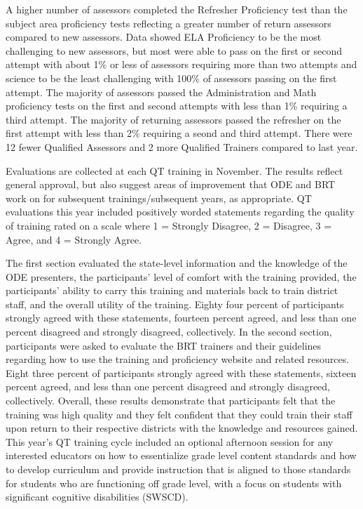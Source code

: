 \documentclass[]{article}
\begin{document}
A higher number of assessors completed the Refresher Proficiency test
than the subject area proficiency tests reflecting a greater number of
return assessors compared to new assessors. Data showed ELA Proficiency
to be the most challenging to new assessors, but most were able to pass
on the first or second attempt with about 1\% or less of assessors
requiring more than two attempts and science to be the least challenging
with 100\% of assessors passing on the first attempt. The majority of
assessors passed the Administration and Math proficiency tests on the
first and second attempts with less than 1\% requiring a third attempt.
The majority of returning assessors passed the refresher on the first
attempt with less than 2\% requiring a seond and third attempt. There
were 12 fewer Qualified Assessors and 2 more Qualified Trainers compared
to last year.

Evaluations are collected at each QT training in November. The results
reflect general approval, but also suggest areas of improvement that ODE
and BRT work on for subsequent trainings/subsequent years, as
appropriate. QT evaluations this year included positively worded
statements regarding the quality of training rated on a scale where 1 =
Strongly Disagree, 2 = Disagree, 3 = Agree, and 4 = Strongly Agree.

The first section evaluated the state-level information and the
knowledge of the ODE presenters, the participants' level of comfort with
the training provided, the participants' ability to carry this training
and materials back to train district staff, and the overall utility of
the training. Eighty four percent of participants strongly agreed with
these statements, fourteen percent agreed, and less than one percent
disagreed and strongly disagreed, collectively. In the second section,
participants were asked to evaluate the BRT trainers and their
guidelines regarding how to use the training and proficiency website and
related resources. Eight three percent of participants strongly agreed
with these statements, sixteen percent agreed, and less than one percent
disagreed and strongly disagreed, collectively. Overall, these results
demonstrate that participants felt that the training was high quality
and they felt confident that they could train their staff upon return to
their respective districts with the knowledge and resources gained. This
year's QT training cycle included an optional afternoon session for any
interested educators on how to essentialize grade level content
standards and how to develop curriculum and provide instruction that is
aligned to those standards for students who are functioning off grade
level, with a focus on students with significant cognitive disabilities
(SWSCD).
\end{document}

